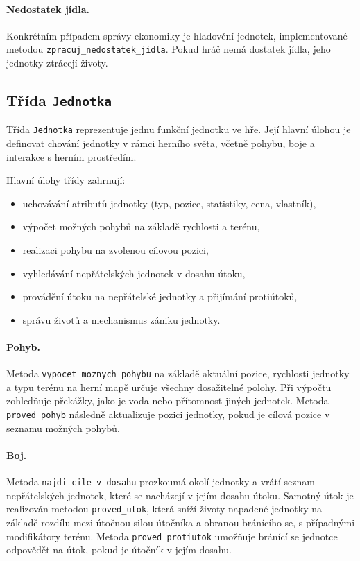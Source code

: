 \paragraph{Nedostatek jídla.}
Konkrétním případem správy ekonomiky je hladovění jednotek, implementované metodou \texttt{zpracuj\_nedostatek\_jidla}. Pokud hráč nemá dostatek jídla, jeho jednotky ztrácejí životy.


\subsection{Třída \texttt{Jednotka}}

Třída \texttt{Jednotka} reprezentuje jednu funkční jednotku ve hře. Její hlavní úlohou je definovat chování jednotky v rámci herního světa, včetně pohybu, boje a interakce s herním prostředím.

Hlavní úlohy třídy zahrnují:
\begin{itemize}
    \item uchovávání atributů jednotky (typ, pozice, statistiky, cena, vlastník),
    \item výpočet možných pohybů na základě rychlosti a terénu,
    \item realizaci pohybu na zvolenou cílovou pozici,
    \item vyhledávání nepřátelských jednotek v dosahu útoku,
    \item provádění útoku na nepřátelské jednotky a přijímání protiútoků,
    \item správu životů a mechanismus zániku jednotky.
\end{itemize}

\paragraph{Pohyb.}
Metoda \texttt{vypocet\_moznych\_pohybu} na základě aktuální pozice, rychlosti jednotky a typu terénu na herní mapě určuje všechny dosažitelné polohy. Při výpočtu zohledňuje překážky, jako je voda nebo přítomnost jiných jednotek. Metoda \texttt{proved\_pohyb} následně aktualizuje pozici jednotky, pokud je cílová pozice v seznamu možných pohybů.

\paragraph{Boj.}
Metoda \texttt{najdi\_cile\_v\_dosahu} prozkoumá okolí jednotky a vrátí seznam nepřátelských jednotek, které se nacházejí v jejím dosahu útoku. Samotný útok je realizován metodou \texttt{proved\_utok}, která sníží životy napadené jednotky na základě rozdílu mezi útočnou silou útočníka a obranou bránícího se, s případnými modifikátory terénu. Metoda \texttt{proved\_protiutok} umožňuje bránící se jednotce odpovědět na útok, pokud je útočník v jejím dosahu.

